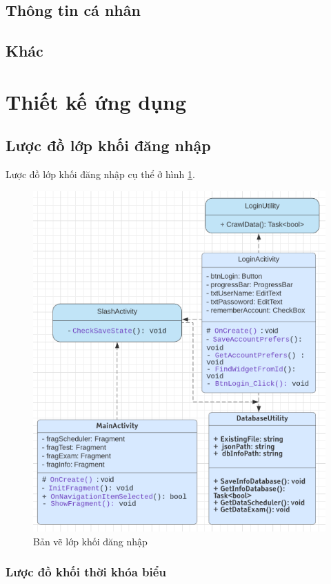 \documentclass[a4paper]{article}
\begin{document}
\subsection{Thông tin cá nhân}
\subsection{Khác}
\section{Thiết kế ứng dụng}
\subsection{Lược đồ lớp khối đăng nhập}
Lược đồ lớp khối đăng nhập cụ thể ở hình \ref{fig:uml_login}.
\begin{figure}[H]
    \centering
    \includegraphics[scale = .5]{uml_login.png}
    \caption{Bản vẽ lớp khối đăng nhập}
    \label{fig:uml_login}
\end{figure}
\subsubsection{Lược đồ khối thời khóa biểu}
\end{document}
